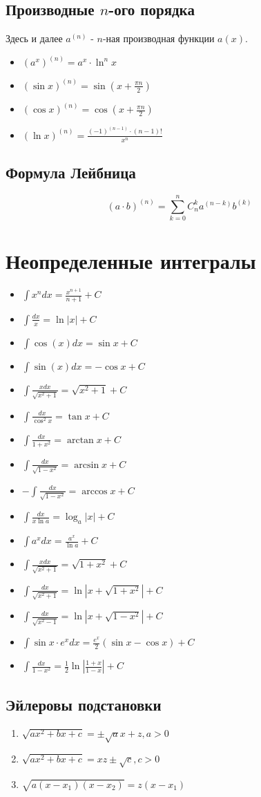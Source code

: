 \documentclass{article}
\begin{document}
	\subsection{Производные $n$-ого порядка}
	Здесь и далее $a^{(n)}$ - $n$-ная производная функции $a(x)$.
	\begin{itemize}
		\item $(a^x)^{(n)}=a^x \cdot \ln^n{x} $
		\item $(\sin{x})^{(n)}=\sin{(x+\frac{\pi n}{2})}$
		\item $(\cos{x})^{(n)}=\cos{(x+\frac{\pi n}{2})}$
		\item $(\ln{x})^{(n)}=\frac{(-1)^{(n-1)}\cdot (n-1)!}{x^n}$
	\end{itemize}
	\subsection{Формула Лейбница}
	$$(a\cdot b)^{(n)}=\sum_{k=0}^n C^k_na^{(n-k)}b^{(k)}$$
	
	\section{Неопределенные интегралы}
	\begin{itemize}
		\item $\int{x^ndx}=\frac{x^{n+1}}{n+1}+C$
		\item $\int \frac{dx}{x} = \ln{|x|} + C$
		\item $\int{\cos{(x)}}dx = \sin{x} + C$
		\item $\int{\sin{(x)}}dx = - \cos{x} + C$
		\item $\int{\frac{xdx}{\sqrt{x^2+1}}} = \sqrt{x^2+1}+C$
		\item $\int\frac{dx}{\cos^2{x}} = \tan{x} +C$
		\item $\int\frac{dx}{1+x^2}=\arctan{x} +C$
		\item $\int\frac{dx}{\sqrt{1-x^2}} = \arcsin x +C$
		\item $-\int\frac{dx}{\sqrt{1-x^2}} = \arccos x +C$
		\item $\int\frac{dx}{x\ln{a}} = \log_a{|x|}+C$                                                                                                     
		\item $\int a^x dx= \frac{a^x}{\ln{a}}+C$
		\item $\int\frac{x dx}{\sqrt{x^2+1}} = \sqrt{1+x^2}+C$
		\item $\int\frac{dx}{\sqrt{x^2+1}} = \ln|x+\sqrt{1+x^2}|+C$
		\item $\int\frac{dx}{\sqrt{x^2-1}} = \ln|x+\sqrt{1-x^2}|+C$
		\item $\int \sin{x}\cdot e^x dx = \frac{e^x}{2}(\sin{x} - \cos{x})+C$

		\item $\int\frac{dx}{1-x^2} = \frac{1}{2}\ln\left|\frac{1+x}{1-x}\right| + C $

	\end{itemize}
	\subsection{Эйлеровы подстановки}
	\begin{enumerate}
	    \item $\sqrt{ax^2+bx+c} = \pm\sqrt{a}x+z,a>0$
	    \item $\sqrt{ax^2+bx+c} = xz \pm \sqrt{c},c>0$
	    \item $\sqrt{a(x - x_1)(x - x_2)} = z(x - x_1)$
	\end{enumerate}

	
\end{document}
